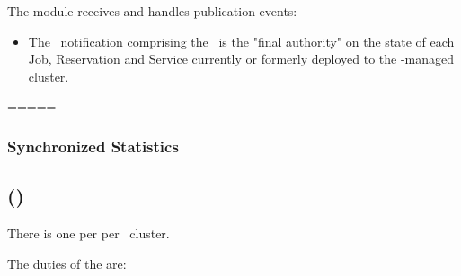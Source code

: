       The module receives and handles publication events:
      \begin{itemize}
      \item \varORmap

      The \varOrchestrator~notification comprising the \varORmap~is the
      "final authority" on the state of each Job, Reservation and Service
      currently or formerly deployed to the \varDUCC-managed cluster.
    
      \end{itemize}    
    
    =====
        
    \subsubsection{Synchronized Statistics}
        

    \subsection{\varWebServer (\varWS)}    
    
    There is one \varWebServer per \varNodeMachineComputer per \varDUCC~cluster.
    
    The duties of the \varWebServer are:
    
